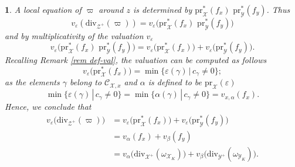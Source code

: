 \documentclass{amsart}%
\numberwithin{equation}{subsection}
\theoremstyle{plain2}
\theoremstyle{definition2}
\theoremstyle{stepstyle}
\theoremstyle{point}
\theoremstyle{subpoint}
\newtheorem{subpoint}[equation]{}%
\newcommand{\spa}[1]{\begin{subpoint}#1\end{subpoint}}           %
\newcommand{\cX}{\ensuremath{\mathscr{X}}}
\newcommand{\caC}{\ensuremath{\mathcal{C}}}
\newcommand{\cY}{\ensuremath{\mathscr{Y}}}
\newcommand{\cZ}{\ensuremath{\mathscr{Z}}}
\renewcommand{\cZ}{\ensuremath{\mathscr{Z}}}
\renewcommand{\cY}{\ensuremath{\mathscr{Y}}}
\newcommand{\pr}{\mathrm{pr}}
\newcommand{\divisor}{\mathrm{div}}
\begin{document}
\spa{A local equation of $\varpi$ around $z$ is determined by $\pr_{\cX}^*(f_x)\,\,\pr_{\cY}^*(f_y)$. Thus $$v_{\varepsilon}(\divisor_{\cZ^+}(\varpi))
= v_{\varepsilon}\big(\pr_{\cX}^*(f_x) \,\,\pr_{\cY}^*(f_y)\big)$$ and by multiplicativity of the valuation $v_{\varepsilon}$ $$v_{\varepsilon}\big(\pr_{\cX}^*(f_x) \,\,\pr_{\cY}^*(f_y)\big) = v_{\varepsilon}\big(\pr_{\cX}^*(f_x)\big) + v_{\varepsilon}\big(\pr_{\cY}^*(f_y)\big).$$ Recalling Remark \ref{rem def-val}, the valuation can be computed as follows $$ v_{\varepsilon}\big(\pr_{\cX}^*(f_x)\big) = \min\{\varepsilon(\gamma)\,|\,c_\gamma \neq 0\};$$ as the elements $\gamma$ belong to $\caC_{\cX,x}$ and $\alpha$ is defined to be $\pr_{\cX}(\varepsilon)$ $$\min\{\varepsilon(\gamma)\,|\,c_\gamma \neq 0\} = \min\{\alpha(\gamma)\,|\,c_\gamma \neq 0\} =  v_{x,\alpha}(f_x).$$ Hence, we conclude that \begin{align*}
v_{\varepsilon}\big(\divisor_{\cZ^+}(\varpi)\big)
& = v_{\varepsilon}\big(\pr_{\cX}^*(f_x)\big) + v_{\varepsilon}\big(\pr_{\cY}^*(f_y)\big)\\
& = v_{\alpha}(f_x) + v_{\beta}(f_y) \\
& = v_{\alpha}\big(\divisor_{\cX^+}(\omega_{\cX_K})\big) + v_{\beta}\big(\divisor_{\cY^+}(\omega_{\cY_K})\big).
\end{align*}

}
\end{document}
